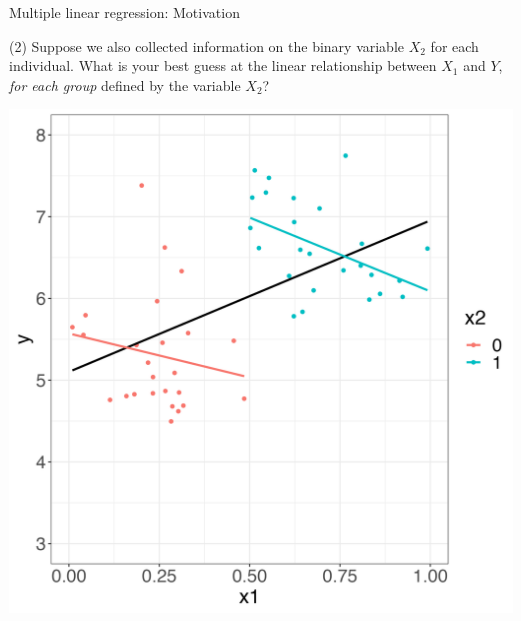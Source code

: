 \documentclass[10pt,t]{beamer}
\begin{document}
\begin{frame}{Multiple linear regression: Motivation}
	\vspace{-5 mm}
	
(2) Suppose we also collected information on the binary variable $X_2$ for each individual. What is your best guess at the linear relationship between $X_1$ and $Y$, \textit{for each group} defined by the variable $X_2$? 

\vspace{0.3cm}

\centering \includegraphics[scale=0.35]{figures/multreg4.png}

\end{frame}
\end{document}
